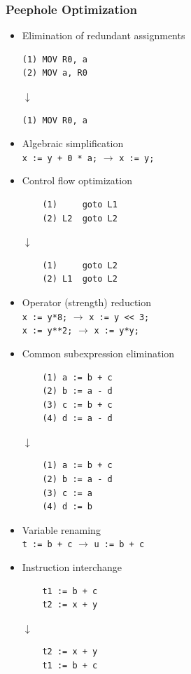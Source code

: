 \subsubsection{Peephole Optimization}
\begin{itemize}
	\item Elimination of redundant assignments
\begin{verbatim}
(1) MOV R0, a
(2) MOV a, R0
\end{verbatim}
\begin{center}$\downarrow$\end{center}
\begin{verbatim}
(1) MOV R0, a
\end{verbatim}
	\item Algebraic simplification \\
\verb|x := y + 0 * a;| $\rightarrow$ \verb|x := y;|
	\item Control flow optimization
\begin{verbatim}
	(1)     goto L1
	(2) L2  goto L2
\end{verbatim}
\begin{center}$\downarrow$\end{center}
\begin{verbatim}
	(1)     goto L2
	(2) L1  goto L2 
\end{verbatim}
	\item Operator (strength) reduction \\
\verb|x := y*8;| $\rightarrow$ \verb|x := y << 3;| \\
\verb|x := y**2;| $\rightarrow$ \verb|x := y*y;|
	\item Common subexpression elimination
\begin{verbatim}
	(1) a := b + c
	(2) b := a - d
	(3) c := b + c
	(4) d := a - d
\end{verbatim} 
\begin{center}$\downarrow$\end{center}
\begin{verbatim}
	(1) a := b + c
	(2) b := a - d
	(3) c := a
	(4) d := b
\end{verbatim}
	\item Variable renaming \\
\verb|t := b + c| $\rightarrow$ \verb|u := b + c|
	\item Instruction interchange
\begin{verbatim}
	t1 := b + c
	t2 := x + y
\end{verbatim}
\begin{center}$\downarrow$\end{center}
\begin{verbatim}
	t2 := x + y
	t1 := b + c
\end{verbatim}
\end{itemize}


